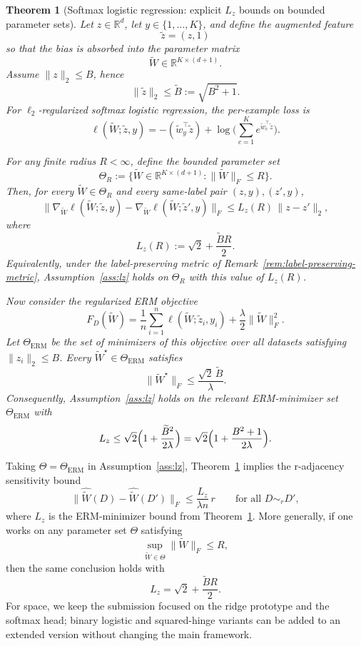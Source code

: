 \documentclass[conference,compsoc]{IEEEtran}
\newtheorem{theorem}{Theorem}
\begin{document}
\begin{theorem}[Softmax logistic regression: explicit $L_z$ bounds on bounded parameter sets]
\label{thm:softmax-lz}
Let $z\in\mathbb{R}^d$, let $y\in\{1,\dots,K\}$, and define the augmented feature
\[
\widetilde z=(z,1)
\]
so that the bias is absorbed into the parameter matrix
\[
\widetilde W\in\mathbb{R}^{K\times(d+1)}.
\]
Assume $\|z\|_2\le B$, hence
\[
\|\widetilde z\|_2\le \widetilde B:=\sqrt{B^2+1}.
\]
For $\ell_2$-regularized softmax logistic regression, the per-example loss is
\[
\ell(\widetilde W;\widetilde z,y)
=
-(\widetilde w_y^\top \widetilde z)
+
\log\!\Big(\sum_{c=1}^K e^{\widetilde w_c^\top \widetilde z}\Big).
\]

For any finite radius $R<\infty$, define the bounded parameter set
\[
\Theta_R
:=
\{\widetilde W\in\mathbb{R}^{K\times(d+1)}:\|\widetilde W\|_F\le R\}.
\]
Then, for every $\widetilde W\in\Theta_R$ and every same-label pair $(z,y),(z',y)$,
\[
\|\nabla_{\widetilde W}\ell(\widetilde W;\widetilde z,y)
-
\nabla_{\widetilde W}\ell(\widetilde W;\widetilde z',y)\|_F
\le
L_z(R)\,\|z-z'\|_2,
\]
where
\[
L_z(R):=\sqrt{2}+\frac{\widetilde B R}{2}.
\]
Equivalently, under the label-preserving metric of Remark~\ref{rem:label-preserving-metric}, Assumption~\ref{ass:lz} holds on $\Theta_R$ with this value of $L_z(R)$.

Now consider the regularized ERM objective
\[
F_D(\widetilde W)
=
\frac{1}{n}\sum_{i=1}^n
\ell(\widetilde W;\widetilde z_i,y_i)
+
\frac{\lambda}{2}\|\widetilde W\|_F^2.
\]
Let $\Theta_{\mathrm{ERM}}$ be the set of minimizers of this objective over all datasets satisfying $\|z_i\|_2\le B$. Every
$\widetilde W^\star\in\Theta_{\mathrm{ERM}}$ satisfies
\[
\|\widetilde W^\star\|_F
\le
\frac{\sqrt{2}\,\widetilde B}{\lambda}.
\]
Consequently, Assumption~\ref{ass:lz} holds on the relevant ERM-minimizer set $\Theta_{\mathrm{ERM}}$ with
\[
L_z
\le
\sqrt{2}\Bigl(1+\frac{\widetilde B^2}{2\lambda}\Bigr)
=
\sqrt{2}\Bigl(1+\frac{B^2+1}{2\lambda}\Bigr).
\]
\end{theorem}

Taking $\Theta=\Theta_{\mathrm{ERM}}$ in Assumption~\ref{ass:lz}, Theorem~\ref{thm:softmax-lz} implies the r-adjacency sensitivity bound
\[
\|\widehat{\widetilde W}(D)-\widehat{\widetilde W}(D')\|_F
\le
\frac{L_z}{\lambda n}\,r
\qquad \text{for all }D\sim_r D',
\]
where $L_z$ is the ERM-minimizer bound from Theorem~\ref{thm:softmax-lz}. More generally, if one works on any parameter set $\Theta$ satisfying
\[
\sup_{\widetilde W\in\Theta}\|\widetilde W\|_F\le R,
\]
then the same conclusion holds with
\[
L_z=\sqrt{2}+\frac{\widetilde B R}{2}.
\]
For space, we keep the submission focused on the ridge prototype and the softmax head; binary logistic and squared-hinge variants can be added to an extended version without changing the main framework.
\end{document}
